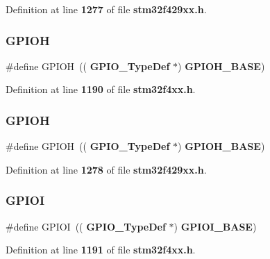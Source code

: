 Definition at line \textbf{ 1277} of file \textbf{ stm32f429xx.\+h}.

\mbox{\label{group__Peripheral__declaration_gadeacbb43ae86c879945afe98c679b285}} 
\subsubsection{G\+P\+I\+OH\hspace{0.1cm}{\footnotesize\ttfamily [1/2]}}
{\footnotesize\ttfamily \#define G\+P\+I\+OH~((\textbf{ G\+P\+I\+O\+\_\+\+Type\+Def} $\ast$) \textbf{ G\+P\+I\+O\+H\+\_\+\+B\+A\+SE})}



Definition at line \textbf{ 1190} of file \textbf{ stm32f4xx.\+h}.

\mbox{\label{group__Peripheral__declaration_gadeacbb43ae86c879945afe98c679b285}} 
\subsubsection{G\+P\+I\+OH\hspace{0.1cm}{\footnotesize\ttfamily [2/2]}}
{\footnotesize\ttfamily \#define G\+P\+I\+OH~((\textbf{ G\+P\+I\+O\+\_\+\+Type\+Def} $\ast$) \textbf{ G\+P\+I\+O\+H\+\_\+\+B\+A\+SE})}



Definition at line \textbf{ 1278} of file \textbf{ stm32f429xx.\+h}.

\mbox{\label{group__Peripheral__declaration_gad15f13545ecdbbabfccf43d5997e5ade}} 
\subsubsection{G\+P\+I\+OI\hspace{0.1cm}{\footnotesize\ttfamily [1/2]}}
{\footnotesize\ttfamily \#define G\+P\+I\+OI~((\textbf{ G\+P\+I\+O\+\_\+\+Type\+Def} $\ast$) \textbf{ G\+P\+I\+O\+I\+\_\+\+B\+A\+SE})}



Definition at line \textbf{ 1191} of file \textbf{ stm32f4xx.\+h}.

